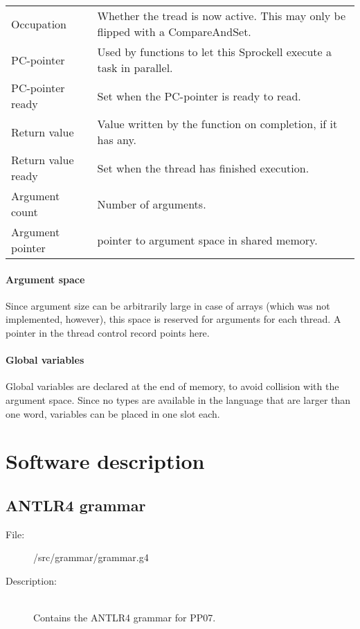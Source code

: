 \documentclass[10pt,a4paper]{report}
\begin{document}
\begin{tabular}{| l | l |}
\hline
Occupation 
	& Whether the tread is now active. This may only be flipped with a CompareAndSet. \\
PC-pointer 
	& Used by functions to let this Sprockell execute a task in parallel. \\
PC-pointer ready 
	& Set when the PC-pointer is ready to read. \\
Return value 
	& Value written by the function on completion, if it has any. \\
Return value ready 
	& Set when the thread has finished execution. \\
Argument count 
	& Number of arguments. \\
Argument pointer 
	& pointer to argument space in shared memory. \\ 
\hline
\end{tabular}

\subsubsection{Argument space}
Since argument size can be arbitrarily large in case of arrays (which was not implemented, however), this space is reserved for arguments for each thread. A pointer in the thread control record points here.
       
\subsubsection{Global variables}
Global variables are declared at the end of memory, to avoid collision with the argument space. Since no types are available in the language that are larger than one word, variables can be placed in one slot each.


\chapter{Software description}

\section{ANTLR4 grammar}

\begin{description}
	\item[File:] /src/grammar/grammar.g4
	\item[Description:] \hfill \\
		Contains the ANTLR4 grammar for PP07.
\end{description}
\end{document}
